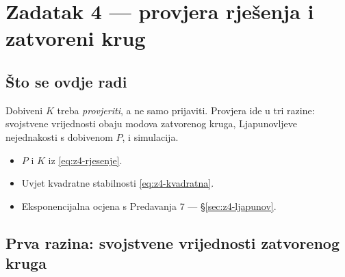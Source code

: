 \chapter{Zadatak 4 --- provjera rješenja i zatvoreni krug}
\label{ch:z4-provjera}

\section{Što se ovdje radi}

Dobiveni $K$ treba \emph{provjeriti}, a ne samo prijaviti. Provjera ide u tri
razine: svojstvene vrijednosti obaju modova zatvorenog kruga, Ljapunovljeve
nejednakosti s dobivenom $P$, i simulacija.

\begin{predznanje}
\begin{itemize}[nosep,leftmargin=*]
  \item $P$ i $K$ iz \eqref{eq:z4-rjesenje}.
  \item Uvjet kvadratne stabilnosti \eqref{eq:z4-kvadratna}.
  \item Eksponencijalna ocjena s Predavanja 7 --- \S\ref{sec:z4-ljapunov}.
\end{itemize}
\end{predznanje}

\section{Prva razina: svojstvene vrijednosti zatvorenog kruga}
\label{sec:z4-eig-zk}

